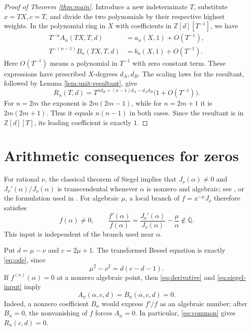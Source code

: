 \documentclass[11pt]{article}
\newcommand{\Z}{\mathbb Z}
\newcommand{\Q}{\mathbb Q}
\begin{document}
\begin{proof}[Proof of Theorem \ref{thm:main}]
Introduce a new indeterminate $T$, substitute $x=TX,c=T$, and divide
the two polynomials by their respective highest weights. In the
polynomial ring in $X$ with coefficients in $\Z[d][T^{-1}]$, we have
\[
 \begin{split}
 T^{-n}A_n(TX,T,d)&=a_n(X,1)+O(T^{-1}),\\
 T^{-(n-1)}B_n(TX,T,d)&=b_n(X,1)+O(T^{-1}).
 \end{split}
\]
Here $O(T^{-1})$ means a polynomial in $T^{-1}$ with zero constant
term. These expressions have prescribed $X$-degrees $d_A,d_B$.
The scaling laws for the resultant, followed by Lemma
\ref{lem:unit-resultant}, give
\[
 R_n(T,d)
 =T^{n d_B+(n-1)d_A-d_Ad_B}\bigl(1+O(T^{-1})\bigr).
\]
For $n=2m$ the exponent is $2m(2m-1)$, while for $n=2m+1$ it is
$2m(2m+1)$. Thus it equals $n(n-1)$ in both cases. Since the
resultant is in $\Z[d][T]$, its leading coefficient is exactly $1$.
\end{proof}

\section{Arithmetic consequences for zeros}

For rational $\nu$, the classical theorem of Siegel implies that
$J_\nu(\alpha)\ne0$ and $J_\nu'(\alpha)/J_\nu(\alpha)$ is
transcendental whenever $\alpha$ is nonzero and algebraic; see
\cite[Chapter 6, Section 2]{Shid89}, or the formulation used in
\cite{LM95}. For algebraic $\mu$, a local branch of
$f=x^{-\mu}J_\nu$ therefore satisfies
\begin{equation}\label{eq:siegel-input}
 f(\alpha)\ne0,\qquad
 \frac{f'(\alpha)}{f(\alpha)}
 =\frac{J_\nu'(\alpha)}{J_\nu(\alpha)}-\frac\mu\alpha
 \notin\overline{\Q}.
\end{equation}
This input is independent of the branch used near $\alpha$.

Put $d=\mu-\nu$ and $c=2\mu+1$. The transformed Bessel equation is
exactly \eqref{eq:ode}, since
\[
 \mu^2-\nu^2=d(c-d-1).
\]
If $f^{(n)}(\alpha)=0$ at a nonzero algebraic point, then
\eqref{eq:derivative} and \eqref{eq:siegel-input} imply
\begin{equation}\label{eq:common}
 A_n(\alpha,c,d)=B_n(\alpha,c,d)=0.
\end{equation}
Indeed, a nonzero coefficient $B_n$ would express $f'/f$ as an
algebraic number; after $B_n=0$, the nonvanishing of $f$ forces
$A_n=0$. In particular, \eqref{eq:common} gives $R_n(c,d)=0$.
\end{document}
